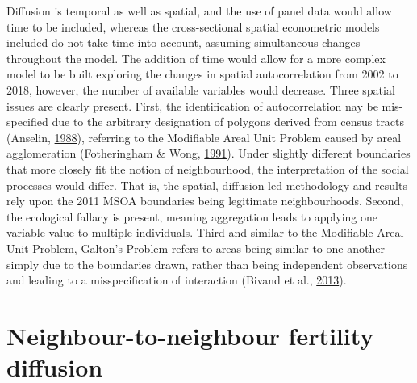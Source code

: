 \documentclass[12pt,twoside]{reedthesis}
\begin{document}
Diffusion is temporal as well as spatial, and the use of panel data would allow time to be included, whereas the cross-sectional spatial econometric models included do not take time into account, assuming simultaneous changes throughout the model. The addition of time would allow for a more complex model to be built exploring the changes in spatial autocorrelation from 2002 to 2018, however, the number of available variables would decrease. Three spatial issues are clearly present. First, the identification of autocorrelation nay be mis-specified due to the arbitrary designation of polygons derived from census tracts (Anselin, \protect\hyperlink{ref-anselin1988}{1988}), referring to the Modifiable Areal Unit Problem caused by areal agglomeration (Fotheringham \& Wong, \protect\hyperlink{ref-fotheringham1991}{1991}). Under slightly different boundaries that more closely fit the notion of neighbourhood, the interpretation of the social processes would differ. That is, the spatial, diffusion-led methodology and results rely upon the 2011 MSOA boundaries being legitimate neighbourhoods. Second, the ecological fallacy is present, meaning aggregation leads to applying one variable value to multiple individuals. Third and similar to the Modifiable Areal Unit Problem, Galton's Problem refers to areas being similar to one another simply due to the boundaries drawn, rather than being independent observations and leading to a misspecification of interaction (Bivand et al., \protect\hyperlink{ref-bivand2013}{2013}).

\hypertarget{neighbour-to-neighbour-fertility-diffusion}{%
\section{Neighbour-to-neighbour fertility diffusion}\label{neighbour-to-neighbour-fertility-diffusion}}
\end{document}
